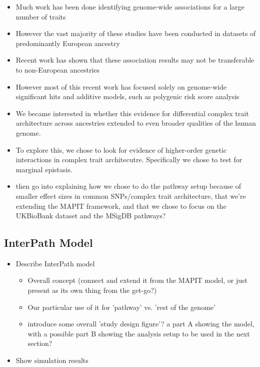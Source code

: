 \documentclass[12pt, a4paper]{article}
\begin{document}
\begin{itemize}
    \item Much work has been done identifying genome-wide associations for a large number of traits
    \item However the vast majority of these studies have been conducted in datasets of predominantly European ancestry
    \item Recent work has shown that these association results may not be transferable to non-European ancestries
    \item However most of this recent work has focused solely on genome-wide significant hits and additive models, such as polygenic risk score analysis
    \item We became interested in whether this evidence for differential complex trait architecture across ancestries extended to even broader qualities of the human genome.
    \item To explore this, we chose to look for evidence of higher-order genetic interactions in complex trait architecutre. Specifically we chose to test for marginal epistasis. 
    \item then go into explaining how we chose to do the pathway setup because of smaller effect sizes in common SNPs/complex trait architecture, that we're extending the MAPIT framework, and that we chose to focus on the UKBioBank dataset and the MSigDB pathways?
\end{itemize}


\subsection{InterPath Model}\label{InterPath-Results-subsection1}

\begin{itemize}
    \item Describe InterPath model
    \begin{itemize}
        \item Overall concept (connect and extend it from the MAPIT model, or just present as its own thing from the get-go?)
        \item Our particular use of it for 'pathway' vs. 'rest of the genome'
        \item introduce some overall 'study design figure'? a part A showing the model, with a possible part B showing the analysis setup to be used in the next section?
    \end{itemize}
    \item Show simulation results
\end{itemize}
\end{document}

